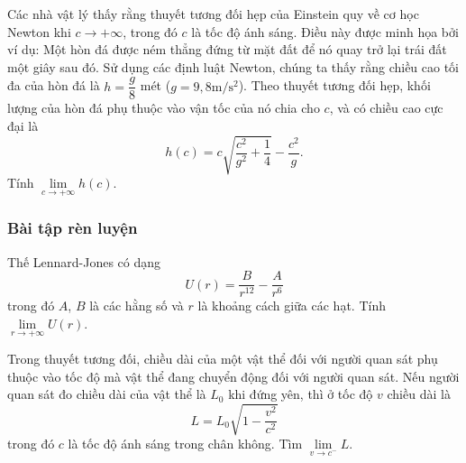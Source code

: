 \begin{vd}%
Các nhà vật lý  thấy rằng thuyết tương đối hẹp của Einstein quy về cơ học Newton khi $c \rightarrow +\infty$, trong đó $c$ là tốc độ ánh sáng. Điều này được minh họa bởi ví dụ: Một hòn đá được ném thẳng đứng từ mặt đất để nó quay trở lại trái đất một giây sau đó. Sử dụng các định luật Newton, chúng ta thấy rằng chiều cao tối đa của hòn đá là $h=\dfrac{g}{8}$ mét ($g = 9{,}8 \mathrm{m/ s ^2}$). Theo thuyết tương đối hẹp, khối lượng của hòn đá phụ thuộc vào vận tốc của nó chia cho $c$, và có chiều cao cực đại là 
\[
h(c)=c \sqrt{\dfrac{c^2}{g^2}+\dfrac{1}{4}}- \dfrac{c^2}{g}.
\]
Tính $\lim\limits _{c \rightarrow +\infty} h(c)$.
\end{vd}



\subsubsection{Bài tập rèn luyện}
\begin{bt}%
Thế Lennard-Jones có dạng $$U(r) = \dfrac{B}{r^{12}} - \dfrac{A}{r^6}$$ trong đó $A$, $B$ là các hằng số và $r$ là khoảng cách giữa các hạt. 
Tính $\lim\limits _{r \rightarrow +\infty} U(r)$.
\end{bt}

\begin{bt}%
Trong thuyết tương đối, chiều dài của một vật thể đối với người quan sát phụ thuộc vào tốc độ mà vật thể đang chuyển động đối với người quan sát. Nếu người quan sát đo chiều dài của vật thể là $L_0$ khi đứng yên, thì ở tốc độ $v$ chiều dài  là
$$
L=L_0 \sqrt{1-\frac{v^2}{c^2}}
$$
trong đó $c$ là tốc độ ánh sáng trong chân không. Tìm $\displaystyle \lim \limits_{v \rightarrow c^{-}} L$. 
\end{bt}

